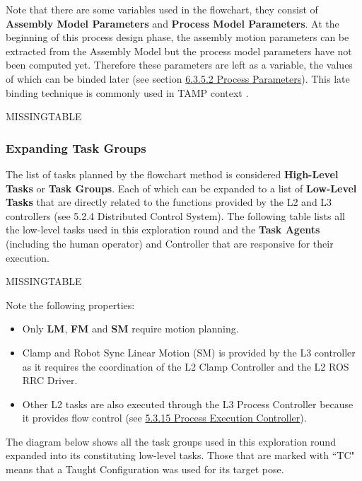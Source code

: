 


Note that there are some variables used in the flowchart, they consist of \textbf{Assembly Model Parameters} and \textbf{Process Model Parameters}. At the beginning of this process design phase, the assembly motion parameters can be extracted from the Assembly Model but the process model parameters have not been computed yet. Therefore these parameters are left as a variable, the values of which can be binded later (see section \ul{6.3.5.2 Process Parameters}). This late binding technique is commonly used in TAMP context \parencite{garrettIntegratedTaskMotion2021a, lozanoperezConstraintBasedMethodSolving2014}.

MISSINGTABLE

\subsubsection{Expanding Task Groups}
\label{subsubsection:exploration_3_expanding_task_groups}

The list of tasks planned by the flowchart method is considered \textbf{High-Level Tasks }or \textbf{Task Groups}. Each of which can be expanded to a list of \textbf{Low-Level Tasks} that are directly related to the functions provided by the L2 and L3 controllers (see 5.2.4 Distributed Control System). The following table lists all the low-level tasks used in this exploration round and the \textbf{Task Agents }(including the human operator) and Controller that are responsive for their execution.

MISSINGTABLE

Note the following properties:

\begin{itemize}
	\item Only \textbf{LM}, \textbf{FM }and \textbf{SM }require motion planning. 

	\item Clamp and Robot Sync Linear Motion (SM) is provided by the L3 controller as it requires the coordination of the L2 Clamp Controller and the L2 ROS RRC Driver. 

	\item Other L2 tasks are also executed through the L3 Process Controller because it provides flow control (see \ul{5.3.15 Process Execution Controller}). 

\end{itemize}
The diagram below shows all the task groups used in this exploration round expanded into its constituting low-level tasks. Those that are marked with ``TC" means that a Taught Configuration was used for its target pose.

